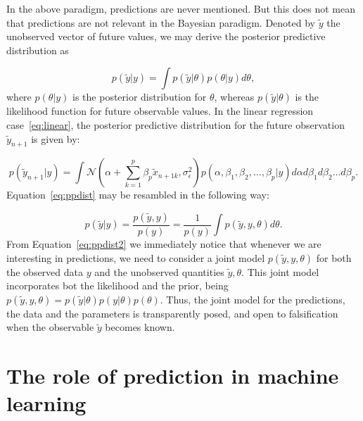 \documentclass{statsoc}
\begin{document}
In the above paradigm, predictions are never mentioned. But this does not mean that predictions are not relevant in the Bayesian paradigm. Denoted by $\tilde{y}$ the unobserved vector of future values, we may derive the posterior predictive distribution as

\begin{equation}
p(\tilde{y}|y) = \int p(\tilde{y}|\theta)p(\theta|y) d\theta,
\label{eq:ppdist}
\end{equation}
%
where $p(\theta|y)$ is the posterior distribution for $\theta$, whereas $p(\tilde{y}|\theta)$ is the likelihood function for future observable values. In the linear regression case~\eqref{eq:linear}, the posterior predictive distribution for the future observation $\tilde{y}_{n+1}$ is given by:

$$ p(\tilde{y}_{n+1}|y)= \int \mathcal{N}(\alpha+\sum_{k=1}^{p}\beta_p \tilde{x}_{n+1k}, \sigma^2_{\epsilon}) p(\alpha, \beta_1, \beta_2,\ldots,\beta_p|y) d\alpha  d\beta_1 d\beta_2\ldots d\beta_p.$$
%
Equation~\eqref{eq:ppdist} may be resambled in the following way:

\begin{equation}
p(\tilde{y}|y) = \frac{p(\tilde{y},y)}{p(y)}= \frac{1}{p(y)}\int p(\tilde{y},y,\theta)d\theta.
\label{eq:ppdist2}
\end{equation}
%
From Equation~\eqref{eq:ppdist2} we immediately notice that whenever we are interesting in predictions, we need to consider a joint model $p(\tilde{y},y,\theta)$ for both the observed data $y$ and the unobserved quantities $\tilde{y},\theta$. This joint model incorporates bot the likelihood and the prior, being $p(\tilde{y},y,\theta) = p(\tilde{y}|\theta)p(y|\theta)p(\theta)$. Thus, the joint model for the predictions, the data and the parameters is transparently posed, and open to falsification when the observable $\tilde{y}$ becomes known.

%

\color{black}


\section{The role of prediction in machine learning}
\end{document}
